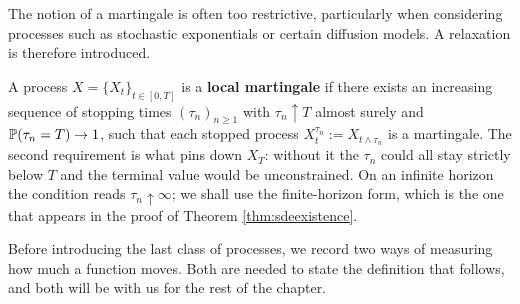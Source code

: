 
\noindent
The notion of a martingale is often too restrictive, particularly when considering processes such as stochastic exponentials or certain diffusion models. A relaxation is therefore introduced.

\begin{definition}\label{def:localmartingale}
A process $X = \{X_t\}_{t \in [0,T]}$ is a \textbf{local martingale} if there exists an increasing sequence of stopping times $(\tau_n)_{n \geq 1}$ with $\tau_n \uparrow T$ almost surely and $\mathbb{P}(\tau_n = T) \to 1$, such that each stopped process $X^{\tau_n}_t := X_{t \wedge \tau_n}$ is a martingale. The second requirement is what pins down $X_T$: without it the $\tau_n$ could all stay strictly below $T$ and the terminal value would be unconstrained. On an infinite horizon the condition reads $\tau_n \uparrow \infty$; we shall use the finite-horizon form, which is the one that appears in the proof of Theorem \ref{thm:sdeexistence}.
\end{definition}


Before introducing the last class of processes, we record two ways of measuring how much a function
moves. Both are needed to state the definition that follows, and both will be with us for the rest
of the chapter.

